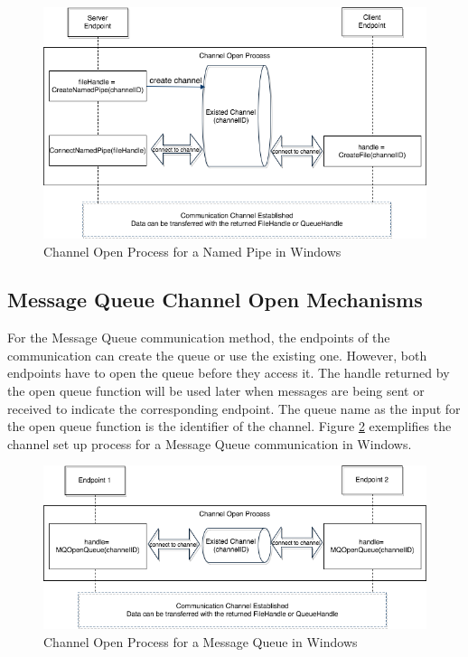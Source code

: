 \begin{figure}[H]
\centerline{\includegraphics[scale=0.5]{Figures/namepipechannelopen}}
 \caption{Channel Open Process for a Named Pipe in Windows}
\label{namedpipeopen}
\end{figure}
    
\subsection{Message Queue Channel Open Mechanisms} 
For the Message Queue communication method, the endpoints of the communication can create the queue or use the existing one. However, both endpoints have to open the queue before they access it. The handle returned by the open queue function will be used later when messages are being sent or received to indicate the corresponding endpoint. The queue name as the input for the open queue function is the identifier of the channel. Figure  \ref{msmqopen} exemplifies the channel set up process for a Message Queue communication in Windows.

\begin{figure}[H]
\centerline{\includegraphics[scale=0.5]{Figures/msmqchannelopen}}
 \caption{Channel Open Process for a Message Queue in Windows}
\label{msmqopen}
\end{figure}

